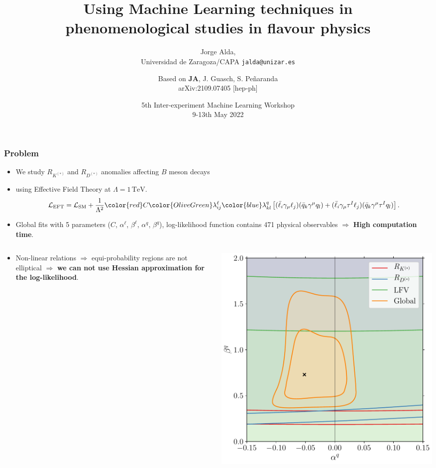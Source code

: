 \documentclass[mathserif, 10pt, dvipsnames]{beamer}
\title[Using ML techniques in phenomenological studies in flavour physics]{Using Machine Learning techniques in\\ phenomenological studies in flavour physics}
\subtitle{Jorge Alda,\\ Universidad de Zaragoza/CAPA \hspace{4em} \texttt{jalda@unizar.es} }
\author[Jorge Alda]{Based on \textbf{JA}, J. Guasch, S. Peñaranda \\
arXiv:2109.07405 [hep-ph]}
\date[CERN Workshop]{5th Inter-experiment Machine Learning Workshop\\ 9-13th May 2022}
\begin{document}
\begin{frame}

\titlepage

\end{frame}

\begin{frame}\frametitle{Problem}
\begin{itemize}
\item We study $R_{K^{(*)}}$ and $R_{D^{(*)}}$ anomalies affecting $B$ meson decays
    \item using Effective Field Theory at $\Lambda = 1\,\mathrm{TeV}$.
$$\mathcal{L}_\mathrm{EFT} = \mathcal{L}_\mathrm{SM} + \frac{1}{\Lambda^2} {\color{red}C} {\color{OliveGreen}\lambda^\ell_{ij}} {\color{blue}\lambda^q_{kl}}\left[ (\bar{\ell}_i \gamma_\mu \ell_j)(\bar{q}_k \gamma^\mu  q_l) + (\bar{\ell}_i \gamma_\mu \tau^I \ell_j)(\bar{q}_k \gamma^\mu \tau^I q_l) \right].$$
\item Global fits with 5 parameters ({\color{red}$C$}, {\color{OliveGreen}$\alpha^\ell$}, {\color{OliveGreen}$\beta^\ell$}, {\color{blue}$\alpha^q$}, {\color{blue}$\beta^q$}), log-likelihood function contains 471 physical observables $\Longrightarrow$ \textbf{High computation time}.
\end{itemize}
\begin{columns}[onlytextwidth]
    \begin{column}{0.7\textwidth}
        \begin{itemize}
\item Non-linear relations $\Longrightarrow$ equi-probability regions are not elliptical $\Longrightarrow$ \textbf{we can not use Hessian approximation for the log-likelihood}.
        \end{itemize}
    \end{column}
    \begin{column}{0.25\textwidth}
        \includegraphics[width=\textwidth]{figures/alphabeta_q.pdf}

\end{column}
\end{columns}
\end{frame}
\end{document}
